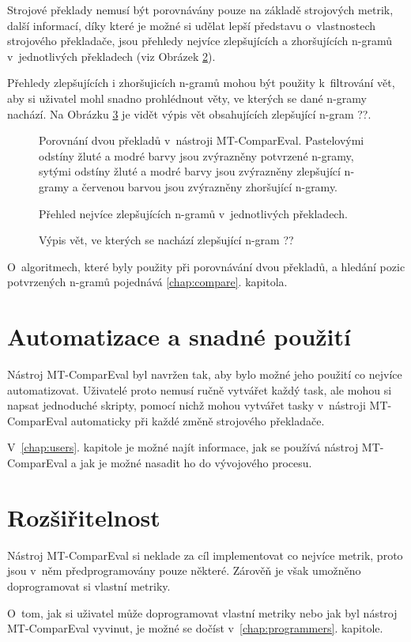 Strojové překlady nemusí být porovnávány pouze na základě strojových metrik,
  další informací,
  díky které je možné si udělat lepší představu o~vlastnostech strojového překladače,
  jsou přehledy nejvíce zlepšujících a zhoršujících \mbox{n-gramů} v~jednotlivých překladech (viz Obrázek \ref{img:confirmed_ngrams}).

Přehledy zlepšujících i zhoršujicích \mbox{n-gramů} mohou být použity k~filtrování vět,
  aby si uživatel mohl snadno prohlédnout věty,
  ve kterých se dané \mbox{n-gramy} nachází.
Na Obrázku \ref{img:filtered_sentences} je vidět výpis vět obsahujících zlepšující \mbox{n-gram} ??.

\begin{figure}
	\caption{
		Porovnání dvou překladů v~nástroji MT-ComparEval.
		Pastelovými odstíny žluté a modré barvy jsou zvýrazněny potvrzené \mbox{n-gramy},
		sytými odstíny žluté a modré barvy jsou zvýrazněny zlepšující \mbox{n-gramy}
		a červenou barvou jsou zvýrazněny zhoršující \mbox{n-gramy}.
	}
	\label{img:compare_sentences}
\end{figure}

\begin{figure}
	\caption{Přehled nejvíce zlepšujících \mbox{n-gramů} v~jednotlivých překladech.}
	\label{img:confirmed_ngrams}
\end{figure}

\begin{figure}
	\caption{Výpis vět, ve kterých se nachází zlepšující \mbox{n-gram} ??}
	\label{img:filtered_sentences}
\end{figure}

O~algoritmech,
  které byly použity při porovnávání dvou překladů,
  a hledání pozic potvrzených \mbox{n-gramů}
  pojednává \ref{chap:compare}. kapitola.


\section{Automatizace a snadné použití}
Nástroj MT-ComparEval byl navržen tak,
  aby bylo možné jeho použití co nejvíce automatizovat.
Uživatelé proto nemusí ručně vytvářet každý task,
  ale mohou si napsat jednoduché skripty,
  pomocí nichž mohou vytvářet tasky v~nástroji MT-ComparEval automaticky při každé změně strojového překladače.

V~\ref{chap:users}. kapitole je možné najít informace,
  jak se používá nástroj MT-ComparEval
  a jak je možné nasadit ho do vývojového procesu.

\section{Rozšiřitelnost}
Nástroj MT-ComparEval si neklade za cíl implementovat co nejvíce metrik,
  proto jsou v~něm předprogramovány pouze některé.
Zárověň je však umožněno doprogramovat si vlastní metriky.

O~tom, jak si uživatel může doprogramovat vlastní metriky nebo jak byl nástroj MT-ComparEval vyvinut,
  je možné se dočíst v~\ref{chap:programmers}. kapitole.

